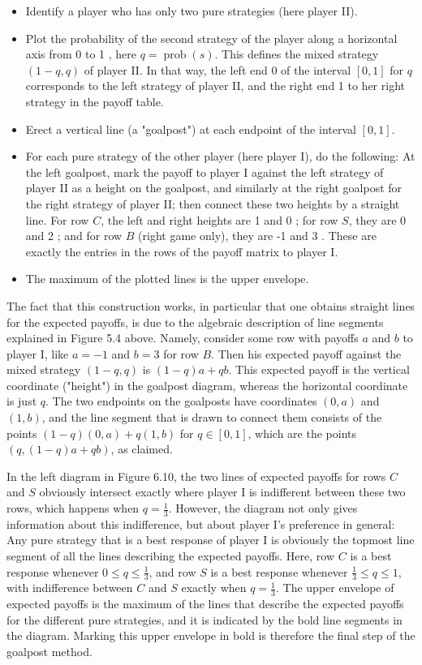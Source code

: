 \documentclass[12pt]{article}
\begin{document}
\begin{itemize}
  \item Identify a player who has only two pure strategies (here player II).
  \item Plot the probability of the second strategy of the player along a horizontal axis from 0 to 1 , here $q=\operatorname{prob}(s)$. This defines the mixed strategy $(1-q, q)$ of player II. In that way, the left end 0 of the interval $[0,1]$ for $q$ corresponds to the left strategy of player II, and the right end 1 to her right strategy in the payoff table.
  \item Erect a vertical line (a "goalpost") at each endpoint of the interval $[0,1]$.
  \item For each pure strategy of the other player (here player I), do the following: At the left goalpost, mark the payoff to player I against the left strategy of player II as a height on the goalpost, and similarly at the right goalpost for the right strategy of player II; then connect these two heights by a straight line. For row $C$, the left and right heights are 1 and 0 ; for row $S$, they are 0 and 2 ; and for row $B$ (right game only), they are -1 and 3 . These are exactly the entries in the rows of the payoff matrix to player I.
  \item The maximum of the plotted lines is the upper envelope.
\end{itemize}

The fact that this construction works, in particular that one obtains straight lines for the expected payoffs, is due to the algebraic description of line segments explained in Figure 5.4 above. Namely, consider some row with payoffs $a$ and $b$ to player I, like $a=-1$ and $b=3$ for row $B$. Then his expected payoff against the mixed strategy $(1-q, q)$ is $(1-q) a+q b$. This expected payoff is the vertical coordinate ("height") in the goalpost diagram, whereas the horizontal coordinate is just $q$. The two endpoints on the goalposts have coordinates $(0, a)$ and $(1, b)$, and the line segment that is drawn to connect them consists of the points $(1-q)(0, a)+q(1, b)$ for $q \in[0,1]$, which are the points $(q,(1-q) a+q b)$, as claimed.

In the left diagram in Figure 6.10, the two lines of expected payoffs for rows $C$ and $S$ obviously intersect exactly where player I is indifferent between these two rows, which happens when $q=\frac{1}{3}$. However, the diagram not only gives information about this indifference, but about player I's preference in general: Any pure strategy that is a best response of player I is obviously the topmost line segment of all the lines describing the expected payoffs. Here, row $C$ is a best response whenever $0 \leq q \leq \frac{1}{3}$, and row $S$ is a best response whenever $\frac{1}{3} \leq q \leq 1$, with indifference between $C$ and $S$ exactly when $q=\frac{1}{3}$. The upper envelope of expected payoffs is the maximum of the lines that describe the expected payoffs for the different pure strategies, and it is indicated by the bold line segments in the diagram. Marking this upper envelope in bold is therefore the final step of the goalpost method.
\end{document}
